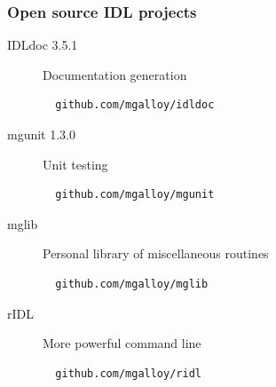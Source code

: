 \documentclass[12pt, handout]{beamer}
\begin{document}
\begin{frame}[t, fragile]
  \frametitle{Open source IDL projects}

\begin{description}
  \item[IDLdoc 3.5.1] Documentation generation
\begin{lstlisting}
  github.com/mgalloy/idldoc
\end{lstlisting}
  \item[mgunit 1.3.0] Unit testing
\begin{lstlisting}
  github.com/mgalloy/mgunit
\end{lstlisting}
  \item[mglib] Personal library of miscellaneous routines
\begin{lstlisting}
  github.com/mgalloy/mglib
\end{lstlisting}
  \item[rIDL] More powerful command line
\begin{lstlisting}
  github.com/mgalloy/ridl
\end{lstlisting}
\end{description}
\end{frame}
\end{document}
